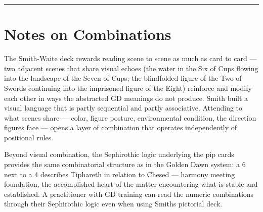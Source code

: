 \begin{center}\rule{0.5\linewidth}{0.5pt}\end{center}

\section{Notes on Combinations}\label{notes-on-combinations}

The Smith-Waite deck rewards reading scene to scene as much as card to card --- two adjacent scenes that share visual echoes (the water in the Six of Cups flowing into the landscape of the Seven of Cups; the blindfolded figure of the Two of Swords continuing into the imprisoned figure of the Eight) reinforce and modify each other in ways the abstracted GD meanings do not produce. Smith built a visual language that is partly sequential and partly associative. Attending to what scenes share --- color, figure posture, environmental condition, the direction figures face --- opens a layer of combination that operates independently of positional rules.

Beyond visual combination, the Sephirothic logic underlying the pip cards provides the same combinatorial structure as in the Golden Dawn system: a 6 next to a 4 describes Tiphareth in relation to Chesed --- harmony meeting foundation, the accomplished heart of the matter encountering what is stable and established. A practitioner with GD training can read the numeric combinations through their Sephirothic logic even when using Smith\textquotesingle s pictorial deck.
